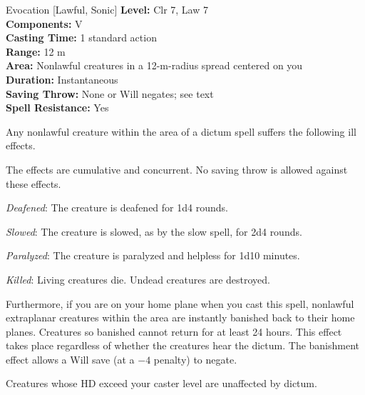 {Evocation [Lawful, Sonic]}
{
	\textbf{Level:}
	Clr 7, Law 7\\
	\textbf{Components:}
	V\\
	\textbf{Casting Time:}
	1 standard action\\
	\textbf{Range:}
	12 m\\
	\textbf{Area:}
	Nonlawful creatures in a 12-m-radius spread centered on you\\
	\textbf{Duration:}
	Instantaneous\\
	\textbf{Saving Throw:}
	None or Will negates; see text\\
	\textbf{Spell Resistance:}
	Yes\\
}
{
	Any nonlawful creature within the area of a dictum spell suffers the following ill effects.

	The effects are cumulative and concurrent. No saving throw is allowed against these effects.

	\textit{Deafened}:
	The creature is deafened for 1d4 rounds.

	\textit{Slowed}:
	The creature is slowed, as by the slow spell, for 2d4 rounds.

	\textit{Paralyzed}:
	The creature is paralyzed and helpless for 1d10 minutes.

	\textit{Killed}:
	Living creatures die. Undead creatures are destroyed.

	Furthermore, if you are on your home plane when you cast this spell, nonlawful extraplanar creatures within the area are instantly banished back to their home planes. Creatures so banished cannot return for at least 24 hours. This effect takes place regardless of whether the creatures hear the dictum. The banishment effect allows a Will save (at a $-4$ penalty) to negate.

	Creatures whose HD exceed your caster level are unaffected by dictum.

}
